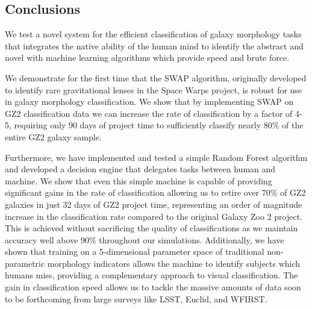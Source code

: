 \documentclass[twocolumn]{aastex6}
\begin{document}
\subsection{Conclusions}

We test a novel system for the efficient classification 
of galaxy morphology tasks that integrates the native ability of the human 
mind to identify the abstract and novel with machine learning algorithms which provide
 speed and brute force.  

We demonstrate for the first time that the SWAP algorithm, 
originally developed to identify rare gravitational lenses in the Space Warps project, 
is robust for use in galaxy morphology classification. We show that by implementing
SWAP on GZ2 classification data we can increase the rate of classification by a factor
of 4-5, requiring only 90 days of project time to sufficiently classify nearly 80\% of the
entire GZ2 galaxy sample. 

Furthermore, we have implemented and tested a simple Random Forest algorithm 
and developed a decision engine that delegates tasks between human and 
machine.  We show that even this simple machine is capable of providing significant 
gains in the rate of classification allowing us to retire over 70\% of GZ2 galaxies in 
just 32 days of GZ2 project time, representing an order of magnitude increase in the
classification rate compared to the original Galaxy Zoo 2 project. This is achieved without 
sacrificing the quality of classifications as we maintain accuracy well above 90\% 
throughout our simulations. 
Additionally, we have shown that training on a 5-dimensional parameter space of 
traditional non-parametric morphology indicators allows the
machine to identify subjects which humans miss, providing  a complementary 
approach to visual classification. 
The gain in classification speed allows us to tackle the massive amounts of data soon
to be forthcoming from large surveys like LSST, Euclid, and WFIRST. 
\end{document}
